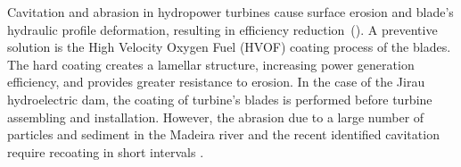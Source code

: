 Cavitation and abrasion in hydropower turbines cause surface erosion and
blade's hydraulic profile deformation, resulting in efficiency
reduction~(\cite{brennen2013cavitation}). A preventive solution is the High
Velocity Oxygen Fuel (HVOF) coating process of the blades. The hard coating creates a lamellar structure,
increasing power generation efficiency, and provides greater
resistance to erosion. In the case of the Jirau hydroelectric dam, the coating
of turbine's blades is performed before turbine assembling and
installation. However, the abrasion due to a large number
of particles and sediment in the Madeira river and the recent identified
cavitation require recoating in short intervals \citep{santa2009slurry}.%



